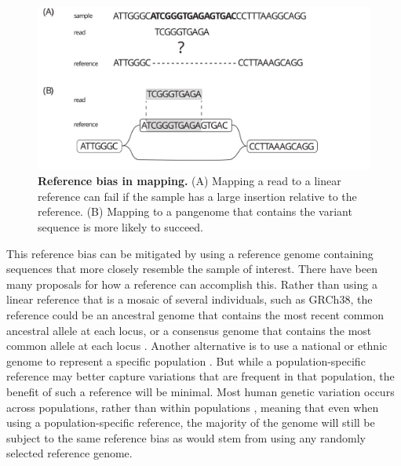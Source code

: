 \documentclass[11pt]{ucscthesis}
\begin{document}
\begin{figure}
    \centering
    \includegraphics[width=\columnwidth]{mapping_example.pdf}
    \caption[Reference bias in mapping]{\textbf{Reference bias in mapping.} (A) Mapping a read to a linear reference can fail if the sample has a large insertion relative to the reference. (B) Mapping to a pangenome that contains the variant sequence is more likely to succeed.}
    \label{fig:mapping_example}
\end{figure}


This reference bias can be mitigated by using a reference genome containing sequences that more closely resemble the sample of interest.
There have been many proposals for how a reference can accomplish this.
Rather than using a linear reference that is a mosaic of several individuals, such as GRCh38, the reference could be an ancestral genome that contains the most recent common ancestral allele at each locus, or a consensus genome that contains the most common allele at each locus \cite{ballouz_is_2019}.
Another alternative is to use a national or ethnic genome to represent a specific population \cite{ballouz_is_2019,chinese_national_genome_2023,korean_national_genome_2016,vietnamese_national_genome_2015,danish_national_genome_2015,swedish_national_genome_2018,kowal_race_2019}.
But while a population-specific reference may better capture variations that are frequent in that population, the benefit of such a reference will be minimal.
Most human genetic variation occurs across populations, rather than within populations \cite{nih_understanding_2007}, meaning that even when using a population-specific reference, the majority of the genome will still be subject to the same reference bias as would stem from using any randomly selected reference genome. 
\end{document}
